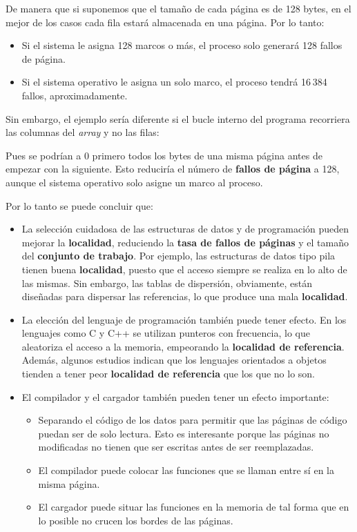 De manera que si suponemos que el tamaño de cada página es de 128 bytes,
en el mejor de los casos cada fila estará almacenada en una página. Por
lo tanto:

\begin{itemize}
\item
  Si el sistema le asigna 128 marcos o más, el proceso solo generará 128
  fallos de página.
\item
  Si el sistema operativo le asigna un solo marco, el proceso tendrá
  16 384 fallos, aproximadamente.
\end{itemize}

Sin embargo, el ejemplo sería diferente si el bucle interno del programa
recorriera las columnas del \emph{array} y no las filas:

Pues se podrían a 0 primero todos los bytes de una misma página antes de
empezar con la siguiente. Esto reduciría el número de \textbf{fallos de
página} a 128, aunque el sistema operativo solo asigne un marco al
proceso.

Por lo tanto se puede concluir que:

\begin{itemize}
\item
  La selección cuidadosa de las estructuras de datos y de programación
  pueden mejorar la \textbf{localidad}, reduciendo la \textbf{tasa de
  fallos de páginas} y el tamaño del \textbf{conjunto de trabajo}. Por
  ejemplo, las estructuras de datos tipo pila tienen buena
  \textbf{localidad}, puesto que el acceso siempre se realiza en lo alto
  de las mismas. Sin embargo, las tablas de dispersión, obviamente,
  están diseñadas para dispersar las referencias, lo que produce una
  mala \textbf{localidad}.
\item
  La elección del lenguaje de programación también puede tener efecto.
  En los lenguajes como C y C++ se utilizan punteros con frecuencia, lo
  que aleatoriza el acceso a la memoria, empeorando la \textbf{localidad
  de referencia}. Además, algunos estudios indican que los lenguajes
  orientados a objetos tienden a tener peor \textbf{localidad de
  referencia} que los que no lo son.
\item
  El compilador y el cargador también pueden tener un efecto importante:

  \begin{itemize}
  \item
    Separando el código de los datos para permitir que las páginas de
    código puedan ser de solo lectura. Esto es interesante porque las
    páginas no modificadas no tienen que ser escritas antes de ser
    reemplazadas.
  \item
    El compilador puede colocar las funciones que se llaman entre sí en
    la misma página.
  \item
    El cargador puede situar las funciones en la memoria de tal forma
    que en lo posible no crucen los bordes de las páginas.
  \end{itemize}
\end{itemize}

